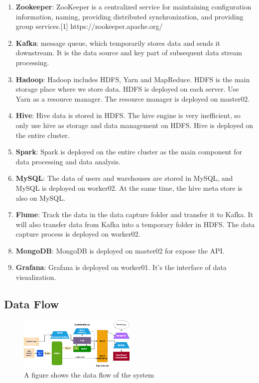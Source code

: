 \begin{enumerate}
    \item \textbf{Zookeeper}: ZooKeeper is a centralized service for maintaining configuration information, naming, providing distributed synchronization, and providing group services.[1] https://zookeeper.apache.org/
    \item \textbf{Kafka}: message queue, which temporarily stores data and sends it downstream. It is the data source and key part of subsequent data stream processing.
    \item \textbf{Hadoop}: Hadoop includes HDFS, Yarn and MapReduce. HDFS is the main storage place where we store data. HDFS is deployed on each server. Use Yarn as a resource manager. The resource manager is deployed on master02.
    \item \textbf{Hive}: Hive data is stored in HDFS. The hive engine is very inefficient, so only use hive as storage and data management on HDFS. Hive is deployed on the entire cluster.
    \item \textbf{Spark}: Spark is deployed on the entire cluster as the main component for data processing and data analysis.
    \item \textbf{MySQL}: The data of users and warehouses are stored in MySQL, and MySQL is deployed on worker02. At the same time, the hive meta store is also on MySQL.
    \item \textbf{Flume}: Track the data in the data capture folder and transfer it to Kafka. It will also transfer data from Kafka into a temporary folder in HDFS. The data capture process is deployed on worker02.
    \item \textbf{MongoDB}: MongoDB is deployed on master02 for expose the API.
    \item \textbf{Grafana}: Grafana is deployed on worker01. It’s the interface of data visualization.
\end{enumerate}




\subsection{Data Flow}

\begin{figure}[H]
    \centering
    \includegraphics[width=0.5\textwidth]{./pic/dataflow.png}
    \caption{A figure shows the data flow of the system}
    \label{fig:dataflow}
\end{figure}


